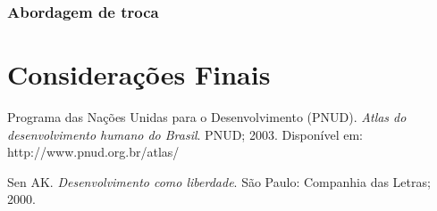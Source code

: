 \documentclass[conference]{IEEEtran}
\begin{document}
\subsubsection{Abordagem de troca}


\section{Considerações Finais}



\begin{thebibliography}{1}


Programa das Nações Unidas para o Desenvolvimento (PNUD). \emph{Atlas do desenvolvimento humano do Brasil}. PNUD; 2003. Disponível em: http://www.pnud.org.br/atlas/

Sen AK. \emph{Desenvolvimento como liberdade}. São Paulo: Companhia das Letras; 2000.


\end{thebibliography}




\end{document}
